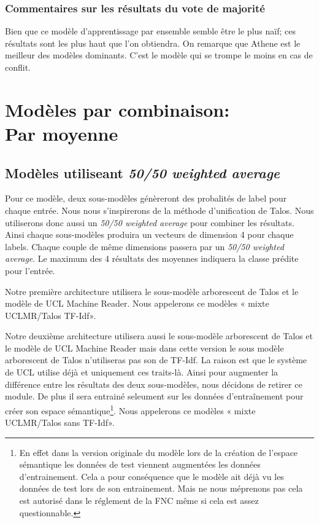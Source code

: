\documentclass[11pt,a4paper,oldfontcommands]{memoir}
\begin{document}
\subsubsection{Commentaires sur les résultats du vote de majorité}
Bien que ce modèle d'apprentissage par ensemble semble être le plus naïf; ces résultats sont les plus haut que l'on obtiendra.
On remarque que Athene est le meilleur des modèles dominants.
C'est le modèle qui se trompe le moins en cas de conflit.



\section{Modèles par combinaison: \\ Par moyenne}

\subsection{Modèles utiliseant \textit{50/50 weighted average}}

Pour ce modèle, deux sous-modèles  génèreront des probalités de label pour chaque entrée.
Nous nous s'inspirerons de la méthode d'unification de Talos.
Nous utiliserons donc aussi un \textit{50/50 weighted average} pour combiner les résultats.
Ainsi chaque sous-modèles produira un vecteurs de dimension 4 pour chaque labels.
Chaque couple de même dimensions passera par un \textit{50/50 weighted average}.
Le maximum des 4 résultats des moyennes indiquera la classe prédite pour l'entrée.

Notre première architecture utilisera le sous-modèle arborescent de Talos et le modèle de UCL Machine Reader.
Nous appelerons ce modèles « mixte UCLMR/Talos TF-Idf».

Notre deuxième architecture utilisera aussi le sous-modèle arborescent de Talos et le modèle de UCL Machine Reader mais dans cette version le sous modèle arborescent de Talos n'utiliseras pas son de TF-Idf. La raison est que le système de UCL utilise déjà et uniquement ces traits-là. Ainsi pour augmenter la différence entre les résultats des deux sous-modèles, nous décidons de retirer ce module. De plus il sera entrainé seleument sur les données d'entraînement pour créer son espace sémantique\footnote{En effet dans la version originale du modèle lors de la création de l'espace sémantique les données de test viennent augmentées les données d'entrainement. Cela a pour conséquence que le modèle ait déjà vu les données de test lors de son entrainement. Mais ne nous méprenons pas cela est autorisé dans le réglement de la FNC même si cela est assez questionnable.}.
Nous appelerons ce modèles « mixte UCLMR/Talos sans TF-Idf».
\end{document}

